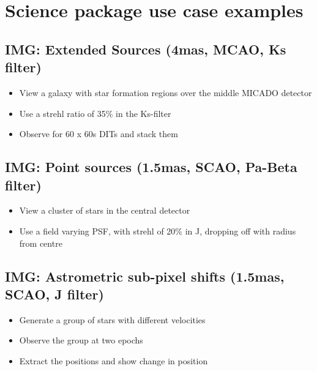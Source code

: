 

\section{Science package use case examples%
  \label{science-package-use-case-examples}%
}


\subsection{IMG: Extended Sources (4mas, MCAO, Ks filter)%
  \label{img-extended-sources-4mas-mcao-ks-filter}%
}

\begin{itemize}
\item View a galaxy with star formation regions over the middle MICADO detector

\item Use a strehl ratio of 35\% in the Ks-filter

\item Observe for 60 x 60s DITs and stack them
\end{itemize}


\subsection{IMG: Point sources (1.5mas, SCAO, Pa-Beta filter)%
  \label{img-point-sources-1-5mas-scao-pa-beta-filter}%
}

\begin{itemize}
\item View a cluster of stars in the central detector

\item Use a field varying PSF, with strehl of 20\% in J, dropping off with radius from centre
\end{itemize}


\subsection{IMG: Astrometric sub-pixel shifts (1.5mas, SCAO, J filter)%
  \label{img-astrometric-sub-pixel-shifts-1-5mas-scao-j-filter}%
}

\begin{itemize}
\item Generate a group of stars with different velocities

\item Observe the group at two epochs

\item Extract the positions and show change in position
\end{itemize}


